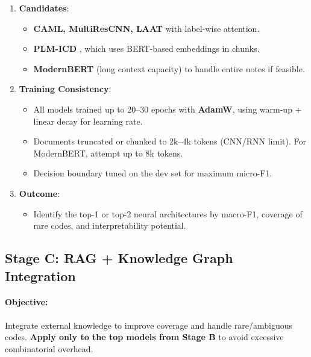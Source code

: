 \documentclass[12pt,a4paper]{report}
\begin{document}
\begin{enumerate}
    \item \textbf{Candidates}:
    \begin{itemize}
        \item \textbf{CAML, MultiResCNN, LAAT} \cite{mullenbach2018explainable,li2020multi,vu2020label} with label-wise attention.
        \item \textbf{PLM-ICD} \cite{huang2022plm}, which uses BERT-based embeddings in chunks.
        \item \textbf{ModernBERT} (long context capacity) to handle entire notes if feasible.
    \end{itemize}
    \item \textbf{Training Consistency}:
    \begin{itemize}
        \item All models trained up to 20--30 epochs with \textbf{AdamW}, using warm-up + linear decay for learning rate.
        \item Documents truncated or chunked to 2k--4k tokens (CNN/RNN limit). For ModernBERT, attempt up to 8k tokens.
        \item Decision boundary tuned on the dev set for maximum micro-F1.
    \end{itemize}
    \item \textbf{Outcome}:
    \begin{itemize}
        \item Identify the top-1 or top-2 neural architectures by macro-F1, coverage of rare codes, and interpretability potential.
    \end{itemize}
\end{enumerate}


\subsection{Stage C: RAG + Knowledge Graph Integration}
\paragraph{Objective:} Integrate external knowledge to improve coverage and handle rare/ambiguous codes. \textbf{Apply only to the top models from Stage B} to avoid excessive combinatorial overhead.
\end{document}
